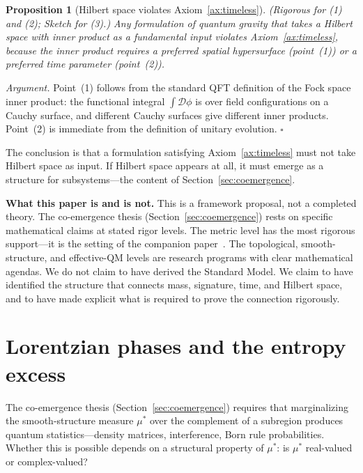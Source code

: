 \documentclass[12pt,a4paper]{article}
\newtheorem{proposition}{Proposition}
\theoremstyle{definition}
\theoremstyle{remark}
\begin{document}
\begin{proposition}[Hilbert space violates Axiom~\ref{ax:timeless}]
\emph{(Rigorous for (1) and (2); Sketch for (3).)}
\label{prop:nohilbert}
Any formulation of quantum gravity that takes a Hilbert space with inner
product as a fundamental input violates Axiom~\ref{ax:timeless}, because the
inner product requires a preferred spatial hypersurface (point~(1)) or a
preferred time parameter (point~(2)).
\end{proposition}

\noindent\emph{Argument.} Point~(1) follows from the standard QFT
definition of the Fock space inner product: the functional integral
$\int\mathcal{D}\phi$ is over field configurations on a Cauchy surface,
and different Cauchy surfaces give different inner products. Point~(2) is
immediate from the definition of unitary evolution. \hfill$\square$

\medskip

The conclusion is that a formulation satisfying Axiom~\ref{ax:timeless}
must not take Hilbert space as input. If Hilbert space appears at all,
it must emerge as a structure for subsystems---the content of
Section~\ref{sec:coemergence}.

\medskip

\noindent\textbf{What this paper is and is not.} This is a framework
proposal, not a completed theory. The co-emergence thesis
(Section~\ref{sec:coemergence}) rests on specific mathematical claims at
stated rigor levels. The metric level has the most rigorous support---it
is the setting of the companion paper~\cite{fixed_point}. The
topological, smooth-structure, and effective-QM levels are research
programs with clear mathematical agendas. We do not claim to have derived
the Standard Model. We claim to have identified the structure that
connects mass, signature, time, and Hilbert space, and to have made
explicit what is required to prove the connection rigorously.

\section{Lorentzian phases and the entropy excess}
\label{sec:phase}

The co-emergence thesis (Section~\ref{sec:coemergence}) requires that
marginalizing the smooth-structure measure $\mu^*$ over the
complement of a subregion produces quantum statistics---density matrices,
interference, Born rule probabilities. Whether this is possible depends
on a structural property of $\mu^*$: is $\mu^*$ real-valued or
complex-valued?
\end{document}
